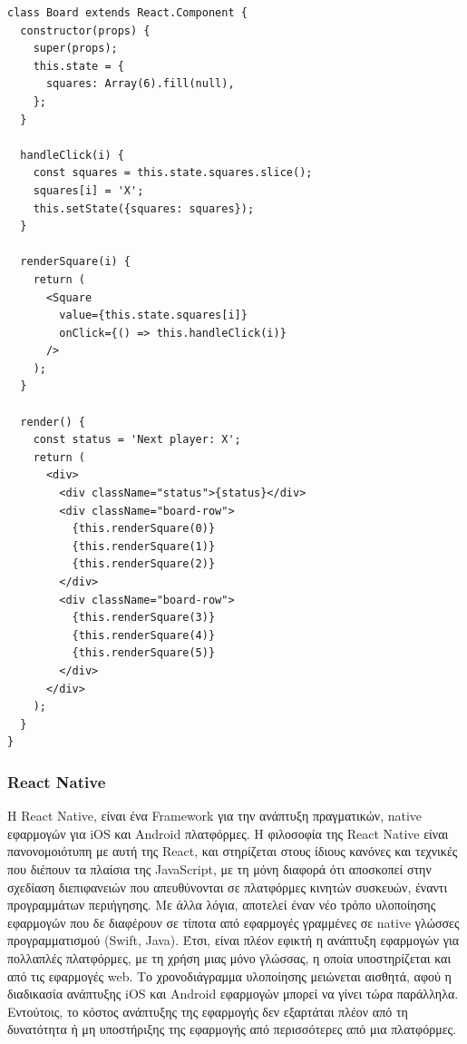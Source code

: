 \begin{lstlisting}[language=React, caption=\selectlanguage{greek}Παράδειγμα κώδικα σε \selectlanguage{english}React\selectlanguage{greek} (Πηγή:\cite{[REACT4]})]
class Board extends React.Component {
  constructor(props) {
    super(props);
    this.state = {
      squares: Array(6).fill(null),
    };
  }

  handleClick(i) {
    const squares = this.state.squares.slice();
    squares[i] = 'X';
    this.setState({squares: squares});
  }

  renderSquare(i) {
    return (
      <Square
        value={this.state.squares[i]}
        onClick={() => this.handleClick(i)}
      />
    );
  }

  render() {
    const status = 'Next player: X';
    return (
      <div>
        <div className="status">{status}</div>
        <div className="board-row">
          {this.renderSquare(0)}
          {this.renderSquare(1)}
          {this.renderSquare(2)}
        </div>
        <div className="board-row">
          {this.renderSquare(3)}
          {this.renderSquare(4)}
          {this.renderSquare(5)}
        </div>
      </div>
    );
  }
}
\end{lstlisting}

\subsubsection{React Native}

Η React Native, είναι ένα Framework για την ανάπτυξη πραγματικών, native εφαρμογών για iOS και Android πλατφόρμες. Η φιλοσοφία της React Native είναι πανονομοιότυπη με αυτή της React, και στηρίζεται στους ίδιους κανόνες και τεχνικές που διέπουν τα πλαίσια της JavaScript, με τη μόνη διαφορά ότι αποσκοπεί στην σχεδίαση διεπιφανειών που απευθύνονται σε πλατφόρμες κινητών συσκευών, έναντι προγραμμάτων περιήγησης. Με άλλα λόγια, αποτελεί έναν νέο τρόπο υλοποίησης εφαρμογών που δε διαφέρουν σε τίποτα από εφαρμογές γραμμένες σε native γλώσσες προγραμματισμού (Swift, Java). Έτσι, είναι πλέον εφικτή η ανάπτυξη εφαρμογών για πολλαπλές πλατφόρμες, με τη χρήση μιας μόνο γλώσσας, η οποία υποστηρίζεται και από τις εφαρμογές web. Το χρονοδιάγραμμα υλοποίησης μειώνεται αισθητά, αφού η διαδικασία ανάπτυξης iOS και Android εφαρμογών μπορεί να γίνει τώρα παράλληλα. Εντούτοις, το κόστος ανάπτυξης της εφαρμογής δεν εξαρτάται πλέον από τη δυνατότητα ή μη υποστήριξης της εφαρμογής από περισσότερες από μια πλατφόρμες. 

